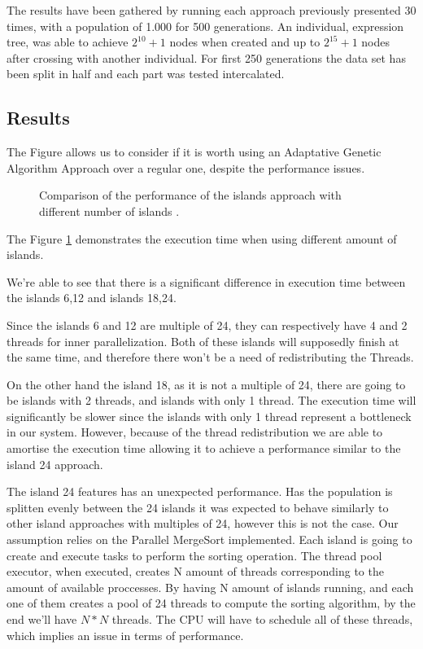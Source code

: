 \documentclass[runningheads]{llncs}
\begin{document}
The results have been gathered by running each approach previously presented 30 times, with a population of 1.000 for 500 generations. An individual, expression tree, was able to achieve \(2^{10} + 1\) nodes when created and up to \(2^{15} + 1\) nodes after crossing with another individual. For first 250 generations the data set has been split in half and each part was tested intercalated.

\subsection{Results}

The Figure allows us to consider if it is worth using an Adaptative Genetic Algorithm Approach over a regular one, despite the performance issues.

\begin{figure}[H]
\centering
{}
\caption{Comparison of the performance of the islands approach with different number of islands .} \label{comparacaoilhas}
\end{figure}

The Figure \ref{comparacaoilhas} demonstrates the execution time when using different amount of islands.

We're able to see that there is a significant difference in execution time between the islands 6,12 and islands 18,24. 

Since the islands 6 and 12 are multiple of 24, they can respectively have 4 and 2 threads for inner parallelization. Both of these islands will supposedly finish at the same time, and therefore there won't be a need of redistributing the Threads.

On the other hand the island 18, as it is not a multiple of 24, there are going to be islands with 2 threads, and islands with only 1 thread. The execution time will significantly be slower since the islands with only 1 thread represent a bottleneck in our system. However, because of the thread redistribution we are able to amortise the execution time allowing it to achieve a performance similar to the island 24 approach.

The island 24 features has an unexpected performance. Has the population is splitten evenly between the 24 islands it was expected to behave similarly to other island approaches with multiples of 24, however this is not the case. Our assumption relies on the Parallel MergeSort implemented. Each island is going to create and execute tasks to perform the sorting operation. The thread pool executor, when executed, creates N amount of threads corresponding to the amount of available proccesses. By having N amount of islands running, and each one of them creates a pool of 24 threads to compute the sorting algorithm, by the end we'll have $N*N$ threads. The CPU will have to schedule all of these threads, which implies an issue in terms of performance.
\end{document}

